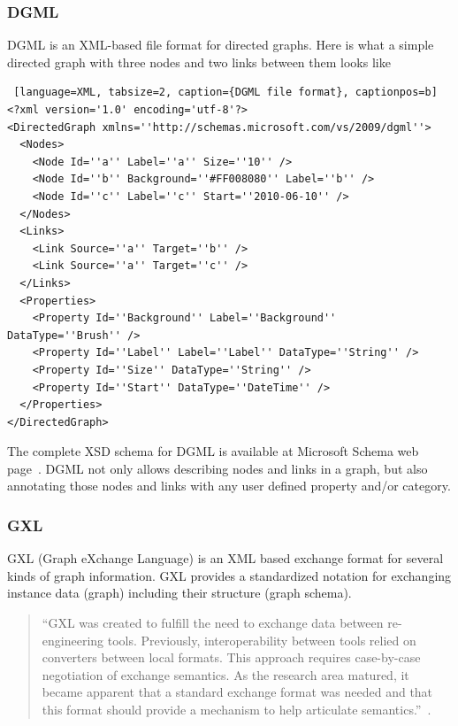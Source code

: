 \subsubsection{DGML}
DGML is an XML-based file format for directed graphs. Here is what a simple directed graph with three nodes and two links between them looks like

\begin{center}
\renewcommand{\thelstlisting}{\thesection.\arabic{lstlisting}}
\begin{lstlisting} [language=XML, tabsize=2, caption={DGML file format}, captionpos=b]
<?xml version='1.0' encoding='utf-8'?>
<DirectedGraph xmlns=''http://schemas.microsoft.com/vs/2009/dgml''>
  <Nodes>
    <Node Id=''a'' Label=''a'' Size=''10'' />
    <Node Id=''b'' Background=''#FF008080'' Label=''b'' />
    <Node Id=''c'' Label=''c'' Start=''2010-06-10'' />
  </Nodes>
  <Links>
    <Link Source=''a'' Target=''b'' />
    <Link Source=''a'' Target=''c'' />
  </Links>
  <Properties>
    <Property Id=''Background'' Label=''Background'' DataType=''Brush'' />
    <Property Id=''Label'' Label=''Label'' DataType=''String'' />
    <Property Id=''Size'' DataType=''String'' />
    <Property Id=''Start'' DataType=''DateTime'' />
  </Properties>
</DirectedGraph>
\end{lstlisting}
\end{center}

The complete XSD schema for DGML is available at Microsoft Schema web page~\cite{DGML_XSD_URL}.
DGML not only allows describing nodes and links in a graph,
but also annotating those nodes and links with any user defined property and/or category.

\subsubsection{GXL}
GXL (Graph eXchange Language) is an XML based exchange format for several kinds of graph information.
GXL provides a standardized notation for exchanging instance data (graph) including their structure (graph schema).

\begin{quotation}
``GXL was created to fulfill the need to exchange data between re-engineering tools.
Previously, interoperability between tools relied on converters between local formats.
This approach requires case-by-case negotiation of exchange semantics.
As the research area matured, it became apparent that a standard exchange format
was needed and that this format should provide a mechanism to help articulate semantics.''~\cite{GXL}.
\end{quotation}

